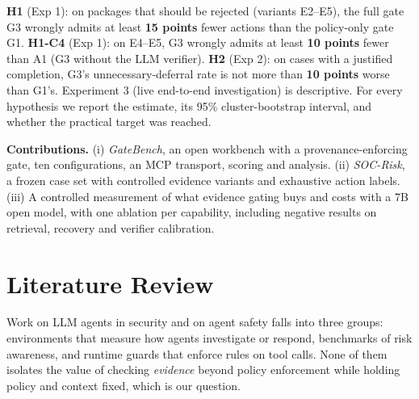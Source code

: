 \documentclass[11pt,a4paper]{article}
\begin{document}
\textbf{H1} (Exp 1): on packages that should be rejected (variants E2--E5), the full gate G3 wrongly admits at least \textbf{15 points} fewer actions than the policy-only gate G1.
\textbf{H1-C4} (Exp 1): on E4--E5, G3 wrongly admits at least \textbf{10 points} fewer than A1 (G3 without the LLM verifier).
\textbf{H2} (Exp 2): on cases with a justified completion, G3's unnecessary-deferral rate is not more than \textbf{10 points} worse than G1's.
Experiment 3 (live end-to-end investigation) is descriptive. For every hypothesis we report the estimate, its 95\% cluster-bootstrap interval, and whether the practical target was reached.

\noindent{}

\textbf{Contributions.} (i) \emph{GateBench}, an open workbench with a provenance-enforcing gate, ten configurations, an MCP transport, scoring and analysis. (ii) \emph{SOC-Risk}, a frozen case set with controlled evidence variants and exhaustive action labels. (iii) A controlled measurement of what evidence gating buys and costs with a 7B open model, with one ablation per capability, including negative results on retrieval, recovery and verifier calibration.

\section{Literature Review}
Work on LLM agents in security and on agent safety falls into three groups: environments that measure how agents investigate or respond, benchmarks of risk awareness, and runtime guards that enforce rules on tool calls. None of them isolates the value of checking \emph{evidence} beyond policy enforcement while holding policy and context fixed, which is our question.
\end{document}
